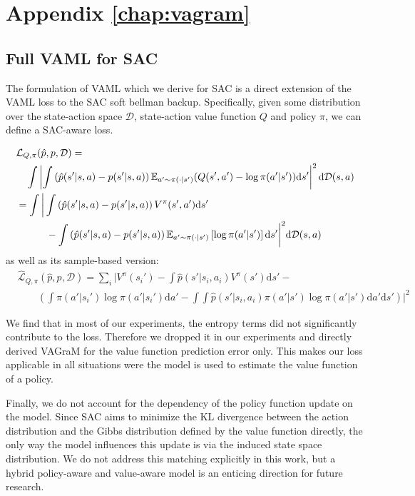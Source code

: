 \chapter{Appendix \autoref{chap:vagram}}

\section{Full VAML for SAC}
\label{app:vagram:vaml_sac}
The formulation of VAML which we derive for SAC is a direct extension of the VAML loss to the SAC soft bellman backup. Specifically, given some distribution over the state-action space $\mathcal{D}$, state-action value function $Q$ and policy $\pi$, we can define a SAC-aware loss.

\begin{align}
    &\mathcal{L}_{Q, \pi}(\hat{p}, p, \mathcal{D}) = \nonumber\\
    &\quad \int \left|\int \left(\hat{p}(s'|s,a) - p(s'|s,a)\right) \mathbb{E}_{a' \sim \pi(\cdot| s')}{\left(Q(s', a') - \log \pi(a'|s')\right)} \mathrm{d}s'\right|^2 \mathrm{d} \mathcal{D}(s,a)\\
    &= \int \bigg|\int \left(\hat{p}(s'|s,a) - p(s'|s,a)\right) V^\pi(s', a')\mathrm{d}s' \nonumber\\
    &\quad\quad\quad- \int \left(\hat{p}(s'|s,a) - p(s'|s,a)\right)\mathbb{E}_{a' \sim \pi(\cdot| s')}\left[\log \pi(a'|s')\right] \mathrm{d}s'\bigg|^2 \mathrm{d} \mathcal{D}(s,a)
\end{align}
as well as its sample-based version:
\begin{align}
    &\hat{\mathcal{L}}_{Q, \pi}(\hat{p}, p, \mathcal{D}) = \sum_{i} \bigg|V^\pi(s_i') -\int \hat{p}(s'|s_i, a_i) V^\pi(s') \mathrm{d}s' - \nonumber\\&\quad\quad\left(\int \pi(a'|s_i')\log\pi(a' | s_i') \mathrm{d}a'- \int \int \hat{p}(s'|s_i,a_i)\pi(a'|s')\log\pi(a' | s')\mathrm{d}a' \mathrm{d}s' \right)\bigg|^2\label{SACVAMLLoss}
\end{align}

We find that in most of our experiments, the entropy terms did not significantly contribute to the loss. 
Therefore we dropped it in our experiments and directly derived VAGraM for the value function prediction error only.
This makes our loss applicable in all situations were the model is used to estimate the value function of a policy.

Finally, we do not account for the dependency of the policy function update on the model.
Since SAC aims to minimize the KL divergence between the action distribution and the Gibbs distribution defined by the value function directly, the only way the model influences this update is via the induced state space distribution.
We do not address this matching explicitly in this work, but a hybrid policy-aware and value-aware model is an enticing direction for future research.

